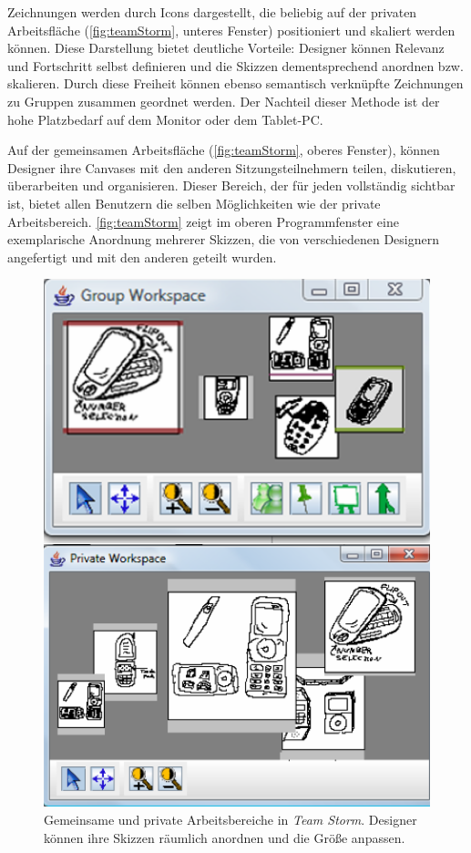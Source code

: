 Zeichnungen werden durch Icons dargestellt, die beliebig auf der privaten Arbeitsfläche (\autoref{fig:teamStorm}, unteres Fenster) positioniert und skaliert werden können. Diese Darstellung bietet deutliche Vorteile: Designer können Relevanz und Fortschritt selbst definieren und die Skizzen dementsprechend anordnen bzw. skalieren. Durch diese Freiheit können ebenso semantisch verknüpfte Zeichnungen zu Gruppen zusammen geordnet werden. Der Nachteil dieser Methode ist der hohe Platzbedarf auf dem Monitor oder dem Tablet-PC.

Auf der gemeinsamen Arbeitsfläche (\autoref{fig:teamStorm}, oberes Fenster), können Designer ihre Canvases mit den anderen Sitzungsteilnehmern teilen, diskutieren, überarbeiten und organisieren. Dieser Bereich, der für jeden vollständig sichtbar ist, bietet allen Benutzern die selben Möglichkeiten wie der private Arbeitsbereich. \autoref{fig:teamStorm} zeigt im oberen Programmfenster eine exemplarische Anordnung mehrerer Skizzen, die von verschiedenen Designern angefertigt und mit den anderen geteilt wurden. \\

\begin{figure}[bth]
	\includegraphics[width=\linewidth]{gfx/teamStormPrivateWorkspace.png}
	\caption[Gemeinsame und private Arbeitsfläche in \emph{Team Storm} \newline \citep{Hailpern:2007p113}]{Gemeinsame und private Arbeitsbereiche in \emph{Team Storm}. Designer können ihre Skizzen räumlich anordnen und die Größe anpassen.}
	\label{fig:teamStorm}
\end{figure}

